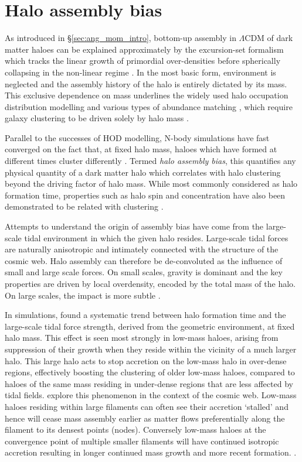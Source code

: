 \section{Halo assembly bias}
As introduced in \S\ref{sec:ang_mom_intro}, bottom-up assembly in $\Lambda$CDM of dark matter haloes can be explained approximately by the excursion-set formalism which tracks the linear growth of primordial over-densities before spherically collapsing in the non-linear regime \citep{press1974,bond1991}. In the most basic form, environment is neglected and the assembly history of the halo is entirely dictated by its mass. This exclusive dependence on mass underlines the widely used halo occupation distribution \citep[HOD; e.g.][]{jing1998,peacock2000} modelling and various types of abundance matching \citep[e.g.][]{kravtsov2004,conroy2006}, which require galaxy clustering to be driven solely by halo mass \citep[e.g.][]{mo1996,sheth1999}. 

Parallel to the successes of HOD modelling, N-body simulations have fast converged on the fact that, at fixed halo mass, haloes which have formed at different times cluster differently \citep[e.g.][]{gao2005,wechsler2006,croton2007,wang2011}. Termed \textit{halo assembly bias}, this quantifies any physical quantity of a dark matter halo which correlates with halo clustering beyond the driving factor of halo mass. While most commonly considered as halo formation time, properties such as halo spin and concentration have also been demonstrated to be related with clustering \citep[e.g.][]{lacerna2012,lehmann2017}. 

Attempts to understand the origin of assembly bias have come from the large-scale tidal environment in which the given halo resides. Large-scale tidal forces are naturally anisotropic and intimately connected with the structure of the cosmic web. Halo assembly can therefore be de-convoluted as the influence of small and large scale forces. On small scales, gravity is dominant and the key properties are driven by local overdensity, encoded by the total mass of the halo. On large scales, the impact is more subtle .

In simulations, \citet{hahn2009} found a systematic trend between halo formation time and the large-scale tidal force strength, derived from the geometric environment, at fixed halo mass. This effect is seen most strongly in low-mass haloes, arising from suppression of their growth when they reside within the vicinity of a much larger halo. This large halo acts to stop accretion on the low-mass halo in over-dense regions, effectively boosting the clustering of older low-mass haloes, compared to haloes of the same mass residing in under-dense regions that are less affected by tidal fields. \citet{ZOMGI} explore this phenomenon in the context of the cosmic web. Low-mass haloes residing within large filaments can often see their accretion `stalled' and hence will cease mass assembly earlier as matter flows preferentially along the filament to its densest points (nodes). Conversely low-mass haloes at the convergence point of multiple smaller filaments will have continued isotropic accretion resulting in longer continued mass growth and more recent formation. \citep[See][for a theoretical approach]{musso2018}.

